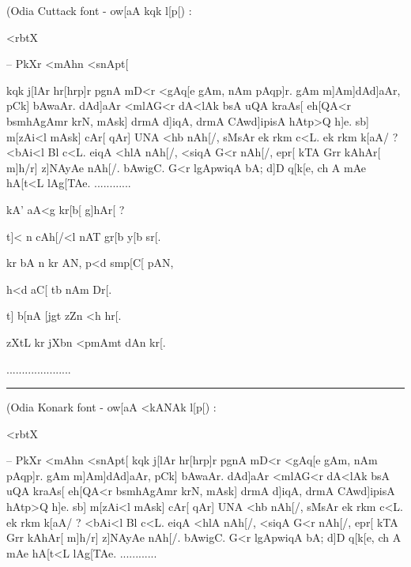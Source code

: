 
\nopagenumbers

\vskip 2in
(Odia Cuttack font - {\odssXII ow\odnukta [aA kqk l[p[}) :
\vskip 0.3in
\centerline{\odssbfXXIV <rbtX}
{\hskip 4.5in} -- {\odssbf PkXr <mAhn <snApt[ }
\vskip 0.2in

{\odssXII 
kqk j[lAr hr[hrp]r p\odsecra gnA mD\odsecya <r <gAq[e g\odsecra Am, nAm pAqp]r. g\odsecra Am m]\odNDa Am]\odNDa[<r <gAq[e Gr. aAg[l[ p[C[l[ cAr[bKrA, K\odnyja A pAc[rX cAL[aA<r W[\odngka [zAL, agNA mD\odsecya <r kZa, aAgk] dA\odNDa d]aAr, pCk] bAw\odnukta [d]aAr. dA\odNDa d]aAr <mlAG<r dA\odNDa <lAk bsA uQA kr aAs[ eh[QA<r bs mhA\odnta [ jm[dAr trPr] g\odsecra Amr krN, mAsk] drmA d]iq\odngka A, drmA CAw\odnukta [ pAut[ b[<zADnX, bAhAlhNA it\odsecya Ad[r] d]ipisA hAtp>Q h]e. sb] m[zAi<l mAsk] cAr[ q\odngka Ar] UNA <hb nAh[/, sMsAr ek rkm c<L. ek rkm k[aA/ ? <bAi<l Bl c<L. eiqA <hlA nAh[/, <siqA G<r nAh[/, epr[ kTA Grr kAhAr[ m]h/r] z]NAyAe nAh[/. bAw\odnukta[<r zAg mAg CAw\odnukta[ sjnA d]igC. G<r lgApw\odnukta[aA brSb[aANX gAI d]iqA b\odndha A; d]D q[k[e, ch \odsecla A m\odnda Ae hA\odNDa [t<L lAg[TAe.} ............

\centerline{\odssslXII kA' aA<g kr[b[ g]hAr[ ? }

\centerline{\odssslXII t]<\odmbha{} n cAh[/<l nAT gr[b y[b sr[.}

\centerline{\odssslXII kr bA n kr \odtra AN,  p<d smp[\odreph C[ p\odsecra AN,}

\centerline{\odssslXII h\odsignri <d aC[ tb nAm Dr[.}

\centerline{\odssslXII t]\odmbha{} b[nA \odtra [jgt zZn\odsecya{} <h hr[.}

\centerline{\odssslXII zXtL kr jXbn <p\odsecra mAm\odsignri t dAn kr[.}

.....................

\vskip 0.5in
\hrule
\vskip 0.5in

(Odia Konark font - {\odXII ow\odnukta [aA <kANAk\odreph{} l[p[}) : 
\vskip 0.3in
\centerline{\odbfXXIV <rbtX}
{\hskip 4.5in} -- {\odbf PkXr <mAhn <snApt[ }
\vskip 0.2in
{\odXII 
kqk j[lAr hr[hrp]r p\odsecra gnA mD\odsecya <r <gAq[e g\odsecra Am, nAm pAqp]r. g\odsecra Am m]\odNDa Am]\odNDa[<r <gAq[e Gr. aAg[l[ p[C[l[ cAr[bKrA, K\odnyja A pAc[rX cAL[aA<r W[\odngka [zAL, agNA mD\odsecya <r kZa, aAgk] dA\odNDa d]aAr, pCk] bAw\odnukta [d]aAr. dA\odNDa d]aAr <mlAG<r dA\odNDa <lAk bsA uQA kr aAs[ eh[QA<r bs mhA\odnta [ jm[dAr trPr] g\odsecra Amr krN, mAsk] drmA d]iq\odngka A, drmA CAw\odnukta [ pAut[ b[<zADnX, bAhAlhNA it\odsecya Ad[r] d]ipisA hAtp>Q h]e. sb] m[zAi<l mAsk] cAr[ q\odngka Ar] UNA <hb nAh[/, sMsAr ek rkm c<L. ek rkm k[aA/ ? <bAi<l Bl c<L. eiqA <hlA nAh[/, <siqA G<r nAh[/, epr[ kTA Grr kAhAr[ m]h/r] z]NAyAe nAh[/. bAw\odnukta[<r zAg mAg CAw\odnukta[ sjnA d]igC. G<r lgApw\odnukta[aA brSb[aANX gAI d]iqA b\odndha A; d]D q[k[e, ch \odsecla A m\odnda Ae hA\odNDa [t<L lAg[TAe.} ............

